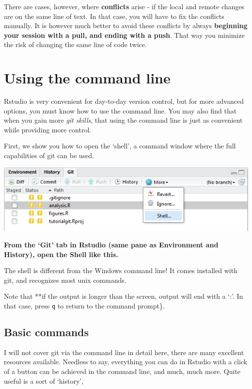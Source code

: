 \documentclass[]{book}
\begin{document}
There are cases, however, where \textbf{conflicts} arise - if the local and remote changes are on the same line of text. In that case, you will have to fix the conflicts manually. It is however much better to avoid these conflicts by always \textbf{beginning your session with a pull, and ending with a push}. That way you minimize the risk of changing the same line of code twice.

\hypertarget{commandline}{%
\section{Using the command line}\label{commandline}}

Rstudio is very convenient for day-to-day version control, but for more advanced options, you must know how to use the command line. You may also find that when you gain more \emph{git skills}, that using the command line is just as convenient while providing more control.

First, we show you how to open the `shell', a command window where the full capabilities of git can be used.

\includegraphics[width=0.75\linewidth]{screenshots/openshell}

\textbf{From the `Git' tab in Rstudio (same pane as Environment and History), open the Shell like this.}

The shell is different from the Windows command line! It comes installed with git, and recognizes most unix commands.

Note that **if the output is longer than the screen, output will end with a `:'. In that case, press \texttt{q} to return to the command prompt\}.

\hypertarget{basic-commands}{%
\subsection{Basic commands}\label{basic-commands}}

I will not cover git via the command line in detail here, there are many excellent resources available. Needless to say, everything you can do in Rstudio with a click of a button can be achieved in the command line, and much, much more. Quite useful is a sort of `history',
\end{document}
